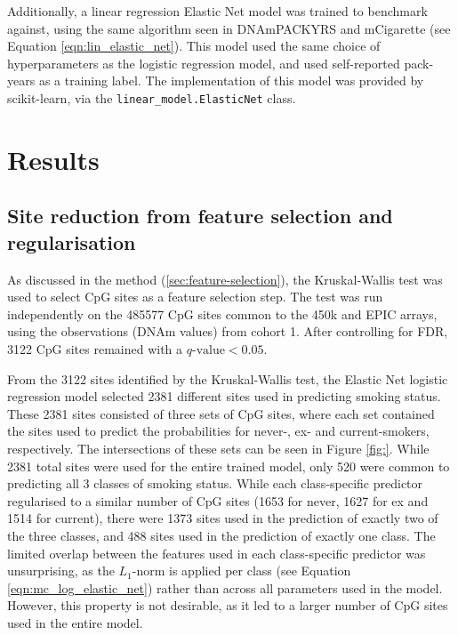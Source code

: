 \documentclass[draft]{article}
\begin{document}
Additionally, a linear regression Elastic Net model was trained to benchmark against, using the same algorithm seen in DNAmPACKYRS and mCigarette (see Equation \ref{eqn:lin_elastic_net}). This model used the same choice of hyperparameters as the logistic regression model, and used self-reported pack-years as a training label. The implementation of this model was provided by scikit-learn, via the \verb|linear_model.ElasticNet| class.

\section{Results} \label{sec:results}

\subsection{Site reduction from feature selection and regularisation}
As discussed in the method (\ref{sec:feature-selection}), the Kruskal-Wallis test was used to select CpG sites as a feature selection step. The test was run independently on the \num{485577} CpG sites common to the 450k and EPIC arrays, using the observations (DNAm values) from cohort 1. After controlling for FDR, \num{3122} CpG sites remained with a \(q\text{-value} < 0.05\).

From the \num{3122} sites identified by the Kruskal-Wallis test, the Elastic Net logistic regression model selected \num{2381} different sites used in predicting smoking status. These \num{2381} sites consisted of three sets of CpG sites, where each set contained the sites used to predict the probabilities for never-, ex- and current-smokers, respectively.
The intersections of these sets can be seen in Figure \ref{fig:}. While \num{2381} total sites were used for the entire trained model, only \num{520} were common to predicting all 3 classes of smoking status. While each class-specific predictor regularised to a similar number of CpG sites (\num{1653} for never, \num{1627} for ex and \num{1514} for current), there were \num{1373} sites used in the prediction of exactly two of the three classes, and \num{488} sites used in the prediction of exactly one class. The limited overlap between the features used in each class-specific predictor was unsurprising, as the \(L_1\)-norm is applied per class (see Equation \ref{eqn:mc_log_elastic_net}) rather than across all parameters used in the model. However, this property is not desirable, as it led to a larger number of CpG sites used in the entire model.
\end{document}
